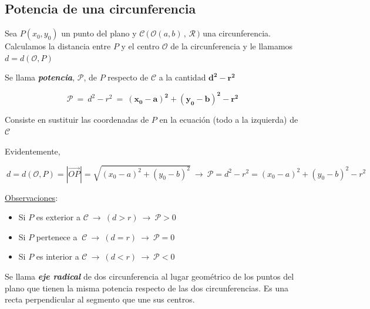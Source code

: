 
\subsection{Potencia de una circunferencia}
\vspace{0.5cm}


\begin{definition}[ Potencia]

Sea $P(x_0,y_0)$ un punto del plano y $\mathcal C \, \Big( \, \mathcal O(a,b)\, , \, \mathcal R \, \Big)$ una circunferencia.	 Calculamos la distancia entre $P$ y el centro $\mathcal O$ de la circunferencia y le llamamos $d=d(\mathcal O, P)$

\vspace{4mm} Se llama \emph{\textbf{potencia}}, $\boldsymbol{\mathcal P}$, de $P$ respecto de $\mathcal C$ a la cantidad $\boldsymbol{d^2-r^2}$

$$\boldsymbol{ \mathcal P \ =} \ d^2-r^2 \ \boldsymbol{ = \ (x_0-a)^2+(y_0-b)^2-r^2}$$

\vspace{4mm} Consiste en sustituir las coordenadas de $P$ en la ecuación (todo a la izquierda) de $\mathcal C$

\vspace{2mm} \textcolor{gris}{Evidentemente, }

\textcolor{gris}{$\ d=d(\mathcal O,P)= |\overrightarrow{OP} |=\sqrt{(x_0-a)^2+(y_0-b)^2} \ \to \ \mathcal P= d^2-r^2=(x_0-a)^2+(y_0-b)^2-r^2$}
\end{definition}
\underline{Observaciones}:

\begin{itemize}
\item Si $P$ es exterior a $\mathcal C \ \to \ (d>r) \ \to \ \mathcal P>0$
\item Si $P$ pertenece a $\ \mathcal C \ \to \ (d=r) \ \to \ \mathcal P=0$
\item Si $P$ es interior a $\mathcal C \ \to \ (d<r) \ \to \ \mathcal P<0$
\end{itemize}

\vspace{5mm}

\begin{definition}

Se llama \textbf{\emph{eje radical}} de dos circunferencia al lugar geométrico de los puntos del plano que tienen la misma potencia respecto de las dos circunferencias. Es una recta perpendicular al segmento que une sus centros.	
\end{definition}

